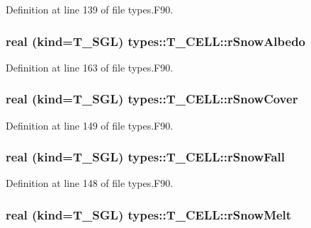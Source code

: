 Definition at line 139 of file types.F90.

\hypertarget{typetypes_1_1_t___c_e_l_l_a96a7ae897548ac05534c2d16a6f920f7}{
\subsubsection[{rSnowAlbedo}]{\setlength{\rightskip}{0pt plus 5cm}real (kind={\bf T\_\-SGL}) {\bf types::T\_\-CELL::rSnowAlbedo}}}
\label{typetypes_1_1_t___c_e_l_l_a96a7ae897548ac05534c2d16a6f920f7}


Definition at line 163 of file types.F90.

\hypertarget{typetypes_1_1_t___c_e_l_l_a6a9988e654fe9666f76e7724a523a25e}{
\subsubsection[{rSnowCover}]{\setlength{\rightskip}{0pt plus 5cm}real (kind={\bf T\_\-SGL}) {\bf types::T\_\-CELL::rSnowCover}}}
\label{typetypes_1_1_t___c_e_l_l_a6a9988e654fe9666f76e7724a523a25e}


Definition at line 149 of file types.F90.

\hypertarget{typetypes_1_1_t___c_e_l_l_abe6f010412795d217a4f33cefd3fa8c5}{
\subsubsection[{rSnowFall}]{\setlength{\rightskip}{0pt plus 5cm}real (kind={\bf T\_\-SGL}) {\bf types::T\_\-CELL::rSnowFall}}}
\label{typetypes_1_1_t___c_e_l_l_abe6f010412795d217a4f33cefd3fa8c5}


Definition at line 148 of file types.F90.

\hypertarget{typetypes_1_1_t___c_e_l_l_afd5e205c3d0e9181f790251604bee34e}{
\subsubsection[{rSnowMelt}]{\setlength{\rightskip}{0pt plus 5cm}real (kind={\bf T\_\-SGL}) {\bf types::T\_\-CELL::rSnowMelt}}}
\label{typetypes_1_1_t___c_e_l_l_afd5e205c3d0e9181f790251604bee34e}


